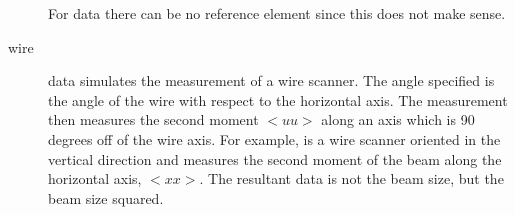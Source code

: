 \begin{description}
For  data there can be no reference element since this does
not make sense.

  \item[wire] \Newline
{} data simulates the measurement of a wire scanner. The angle
specified is the angle of the wire with respect to the horizontal
axis. The measurement then measures the second moment $<uu>$ along an
axis which is 90 degrees off of the wire axis. For example,
 is a wire scanner oriented in the vertical direction and
measures the second moment of the beam along the horizontal axis,
$<xx>$. The resultant data is not the beam size, but the beam size
squared.

  \end{description}





